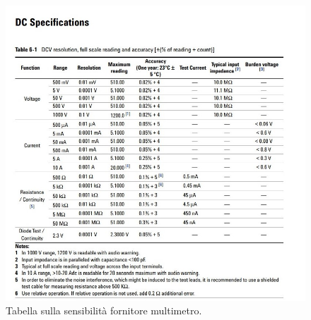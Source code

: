 \documentclass[letterpaper,12pt]{article}
\begin{document}
\begin{figure}[h!] %
    \centering
    \includegraphics[width=1\textwidth]{tabella_errori.png}
    \caption{Tabella sulla sensibilità fornitore multimetro.}
    \label{fig:Tabella_sensibilità}
\end{figure}
\end{document}

